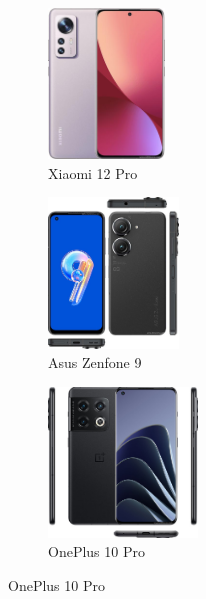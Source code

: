 \documentclass[answers, 10pt, UKenglish]{exam}
\begin{document}
\begin{figure}[htpb]
	\begin{subfigure}[htpb]{0.25\linewidth}
	\begin{center}
		\includegraphics[width=\linewidth,height=4cm,keepaspectratio]{xiaomi-12-pro}
	\end{center}
	\caption{Xiaomi 12 Pro}
	\label{fig:xiaomi-12-pro}
	\end{subfigure}
	\begin{subfigure}[htpb]{0.25\linewidth}
	\begin{center}
		\includegraphics[width=\linewidth,height=4cm,keepaspectratio]{asus-zenfone-9}
	\end{center}
	\caption{Asus Zenfone 9}
	\label{fig:asus-zenfone-9}
	\end{subfigure}
	\begin{subfigure}[htpb]{0.25\linewidth}
	\begin{center}
		\includegraphics[width=\linewidth,height=4cm,keepaspectratio]{oneplus-10-pro}
	\end{center}
	\caption{OnePlus 10 Pro}
	\label{fig:oneplus-10-pro}
	\end{subfigure}


\end{figure}
\end{document}
